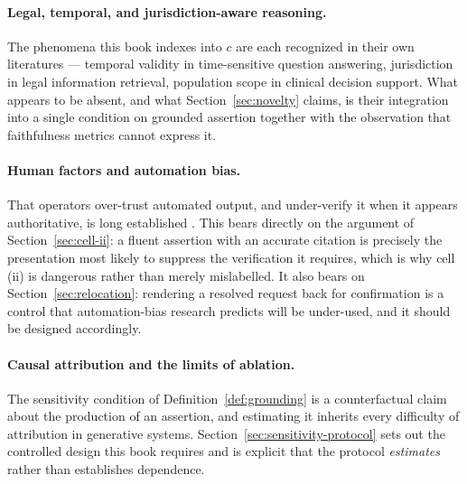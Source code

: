 \paragraph{Legal, temporal, and jurisdiction-aware reasoning.} The phenomena this
book indexes into $c$ are each recognized in their own literatures --- temporal
validity in time-sensitive question answering, jurisdiction in legal information
retrieval, population scope in clinical decision support.
What appears to be absent, and what Section~\ref{sec:novelty} claims, is their
integration into a single condition on grounded assertion together with the
observation that faithfulness metrics cannot express it.

\paragraph{Human factors and automation bias.} That operators over-trust automated
output, and under-verify it when it appears authoritative, is long established
\citep{parasuraman1997,skitka1999}. This bears directly on the argument of
Section~\ref{sec:cell-ii}: a fluent assertion with an accurate citation is precisely
the presentation most likely to suppress the verification it requires, which is why
cell (ii) is dangerous rather than merely mislabelled. It also bears on
Section~\ref{sec:relocation}: rendering a resolved request back for confirmation is a
control that automation-bias research predicts will be under-used, and it should be
designed accordingly.

\paragraph{Causal attribution and the limits of ablation.} The
sensitivity condition of Definition~\ref{def:grounding} is a counterfactual claim
about the production of an assertion, and estimating it inherits every difficulty of
attribution in generative systems. Section~\ref{sec:sensitivity-protocol} sets out the
controlled design this book requires and is explicit that the protocol
\emph{estimates} rather than establishes dependence.

